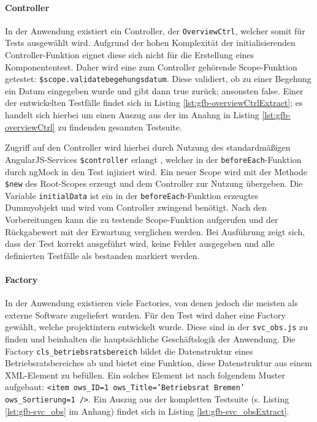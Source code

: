 \paragraph{Controller}
In der Anwendung existiert ein Controller, der \texttt{OverviewCtrl}, welcher somit für Tests ausgewählt wird. Aufgrund der hohen Komplexität der initialisierenden Controller-Funktion eignet diese sich nicht für die Erstellung eines Komponententest. Daher wird eine zum Controller gehörende Scope-Funktion getestet: \texttt{\$scope.validatebegehungsdatum}. Diese validiert, ob zu einer Begehung ein Datum eingegeben wurde und gibt dann true zurück; ansonsten false. Einer der entwickelten Testfälle findet sich in Listing \ref{lst:gfb-overviewCtrlExtract}; es handelt sich hierbei um einen Auszug aus der im Anahng in Listing \ref{lst:gfb-overviewCtrl} zu findenden gesamten Testsuite.

\begin{figure}[H]
	
\end{figure}

Zugriff auf den Controller wird hierbei durch Nutzung des standardmäßigen AngularJS-Services \texttt{\$controller} erlangt \cite{angular-controllerAPI}, welcher in der \texttt{beforeEach}-Funktion durch ngMock in den Test injiziert wird. Ein neuer Scope wird mit der Methode \texttt{\$new} des Root-Scopes erzeugt und dem Controller zur Nutzung übergeben. Die Variable \texttt{initialData} ist ein in der \texttt{beforeEach}-Funktion erzeugtes Dummyobjekt und wird vom Controller zwingend benötigt. Nach den Vorbereitungen kann die zu testende Scope-Funktion aufgerufen und der Rückgabewert mit der Erwartung verglichen werden. Bei Ausführung zeigt sich, dass der Test korrekt ausgeführt wird, keine Fehler ausgegeben und alle definierten Testfälle als bestanden markiert werden.

\paragraph{Factory}
In der Anwendung existieren viele Factories, von denen jedoch die meisten als externe Software zugeliefert wurden. Für den Test wird daher eine Factory gewählt, welche projektintern entwickelt wurde. Diese sind in der \texttt{svc\_obs.js} zu finden und beinhalten die hauptsächliche Geschäftslogik der Anwendung. Die Factory \texttt{cls\_betriebsratsbereich} bildet die Datenstruktur eines Betriebsratsbereiches ab und bietet eine Funktion, diese Datenstruktur aus einem XML-Element zu befüllen. Ein solches Element ist nach folgendem Muster aufgebaut: \texttt{<item ows\_ID=1 ows\_Title='Betriebsrat Bremen' ows\_Sortierung=1 />}. Ein Auszug aus der kompletten Testsuite (s. Listing \ref{lst:gfb-svc_obs} im Anhang) findet sich in Listing \ref{lst:gfb-svc_obsExtract}.


